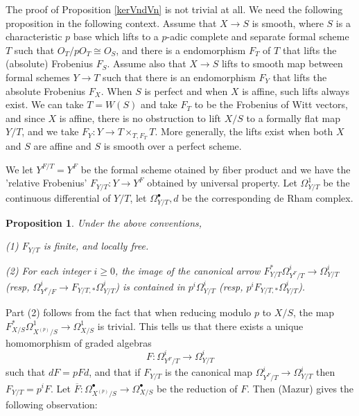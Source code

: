 \documentclass[a4paper,12pt,twoside]{report}
\newtheorem{proposition}[theorem]{Proposition}
\begin{document}
\begin{appendices}
    The proof of Proposition \ref{kerVndVn} is not trivial at all. 
    We need the following proposition in the following context. 
    Assume that $X\rightarrow S$ is smooth, where $S$ is a characteristic $p$ base which lifts to 
a $p$-adic complete and separate formal scheme $T$ such that 
    $O_T/pO_T\cong O_S$, and there is a endomorphism $F_T$ of $T$ that lifts the (absolute) Frobenius $F_S$. Assume also that
$X\rightarrow S$ lifts to smooth map between formal schemes $Y\rightarrow T$ such that there is an endomorphism 
    $F_Y$ that lifts the absolute Frobenius $F_X$. 
    When $S$ is perfect and when $X$ is affine, such lifts always exist. 
    We can take $T=W(S)$ and take $F_T$ to be the Frobenius of Witt vectors, 
    and since $X$ is affine, there is no obstruction to lift $X/S$ to a formally flat map $Y/T$, and we take $F_Y:Y\rightarrow T\times_{T,F_T}T$. 
    More generally, the lifts exist when both $X$ and $S$ are affine and $S$ is smooth over a perfect scheme.  
    
    We let $Y^{F/T}=Y^{F}$ be the formal scheme otained by fiber product 
    and we have the 'relative Frobenius' $F_{Y/T}:Y\rightarrow Y^{F}$ obtained by universal property. 
    Let $\Omega^1_{Y/T}$ be the continuous differential of $Y/T$, let $\Omega^\bullet_{Y/T},d$ be the corresponding de Rham complex. 
    
    \begin{proposition}
        Under the above conventions, 
    
        {\rm (1)} $F_{Y/T}$ is finite, and locally free.
    
        {\rm (2)} For each integer $i\geqslant 0$, the image of the canonical arrow 
        $F_{Y/T}^*\Omega^i_{Y^F/T}\rightarrow \Omega^i_{Y/T}$ (resp, 
        $\Omega^i_{Y^F/F}\rightarrow F_{Y/T,*}\Omega^i_{Y/T}$) is contained in $p^i\Omega^i_{Y/T}$
        (resp, $p^iF_{Y/T,*}\Omega^i_{Y/T}$). 
    \end{proposition} 
    
   Part (2) follows from the fact that when reducing modulo $p$ to $X/S$, 
the map $F_{X/S}^*\Omega^1_{X^{(p)}/S}\rightarrow \Omega^1_{X/S}$ is trivial. 
    This tells us that there exists a unique homomorphism of graded algebras 
    \[F: \Omega^i_{Y^F/T}\rightarrow \Omega^i_{Y/T}\] 
    such that $dF=pFd$, and that if $F_{Y/T}$ is the canonical map 
    $\Omega^i_{Y^F/T}\rightarrow \Omega^i_{Y/T}$ then $F_{Y/T}=p^iF$. 
    Let $\overline{F}: \Omega^\bullet_{X^{(p)}/S}\rightarrow \Omega^\bullet_{X/S}$ be the reduction of $F$. 
    Then (Mazur) gives the following observation: 
    

\end{appendices}
\end{document}
